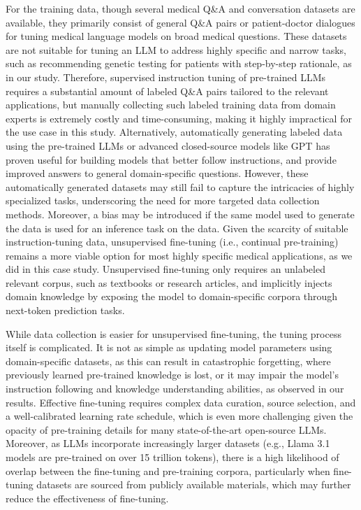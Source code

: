 \documentclass[fleqn,10pt]{wlscirep}
\begin{document}
For the training data, though several medical Q\&A and conversation datasets are available, they primarily consist of general Q\&A pairs or patient-doctor dialogues for tuning medical language models on broad medical questions. These datasets are not suitable for tuning an LLM to address highly specific and narrow tasks, such as recommending genetic testing for patients with step-by-step rationale, as in our study. Therefore, supervised instruction tuning of pre-trained LLMs requires a substantial amount of labeled Q\&A pairs tailored to the relevant applications, but manually collecting such labeled training data from domain experts is extremely costly and time-consuming, making it highly impractical for the use case in this study. Alternatively, automatically generating labeled data using the pre-trained LLMs or advanced closed-source models like GPT has proven useful for building models that better follow instructions, and provide improved answers to general domain-specific questions. However, these automatically generated datasets may still fail to capture the intricacies of highly specialized tasks, underscoring the need for more targeted data collection methods. Moreover, a bias may be introduced if the same model used to generate the data is used for an inference task on the data. Given the scarcity of suitable instruction-tuning data, unsupervised fine-tuning (i.e., continual pre-training) remains a more viable option for most highly specific medical applications, as we did in this case study. Unsupervised fine-tuning only requires an unlabeled relevant corpus, such as textbooks or research articles, and implicitly injects domain knowledge by exposing the model to domain-specific corpora through next-token prediction tasks. 

While data collection is easier for unsupervised fine-tuning, the tuning process itself is complicated. It is not as simple as updating model parameters using domain-specific datasets, as this can result in catastrophic forgetting, where previously learned pre-trained knowledge is lost, or it may impair the model’s instruction following and knowledge understanding abilities, as observed in our results. Effective fine-tuning requires complex data curation, source selection, and a well-calibrated learning rate schedule, which is even more challenging given the opacity of pre-training details for many state-of-the-art open-source LLMs. Moreover, as LLMs incorporate increasingly larger datasets (e.g., Llama 3.1 models are pre-trained on over 15 trillion tokens), there is a high likelihood of overlap between the fine-tuning and pre-training corpora, particularly when fine-tuning datasets are sourced from publicly available materials, which may further reduce the effectiveness of fine-tuning.
\end{document}
